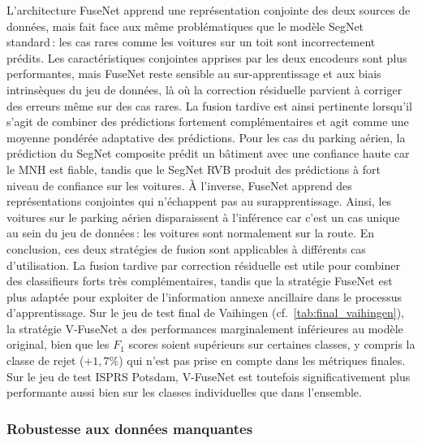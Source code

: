 L'architecture FuseNet apprend une représentation conjointe des deux sources de données, mais fait face aux même problématiques que le modèle SegNet standard\,: les cas rares comme les voitures sur un toit sont incorrectement prédits. Les caractéristiques conjointes apprises par les deux encodeurs sont plus performantes, mais FuseNet reste sensible au sur-apprentissage et aux biais intrinsèques du jeu de données, là où la correction résiduelle parvient à corriger des erreurs même sur des cas rares.
La fusion tardive est ainsi pertinente lorsqu'il s'agit de combiner des prédictions fortement complémentaires et agit comme une moyenne pondérée adaptative des prédictions. Pour les cas du parking aérien, la prédiction du SegNet composite prédit un bâtiment avec une confiance haute car le \gls{MNH} est fiable, tandis que le SegNet \gls{RVB} produit des prédictions à fort niveau de confiance sur les voitures. À l'inverse, FuseNet apprend des représentations conjointes qui n'échappent pas au surapprentissage. Ainsi, les voitures sur le parking aérien disparaissent à l'inférence car c'est un cas unique au sein du jeu de données\,: les voitures sont normalement sur la route.
En conclusion, ces deux stratégies de fusion sont applicables à différents cas d'utilisation. La fusion tardive par correction résiduelle est utile pour combiner des classifieurs forts très complémentaires, tandis que la stratégie FuseNet est plus adaptée pour exploiter de l'information annexe ancillaire dans le processus d'apprentissage.
Sur le jeu de test final de Vaihingen (cf.~\cref{tab:final_vaihingen}), la stratégie V-FuseNet a des performances marginalement inférieures au modèle original, bien que les $F_1$ scores soient supérieurs sur certaines classes, y compris la classe de rejet ($+1,7\%$) qui n'est pas prise en compte dans les métriques finales. Sur le jeu de test \gls{ISPRS} Potsdam, V-FuseNet est toutefois significativement plus performante aussi bien sur les classes individuelles que dans l'ensemble.

\subsubsection{Robustesse aux données manquantes}

